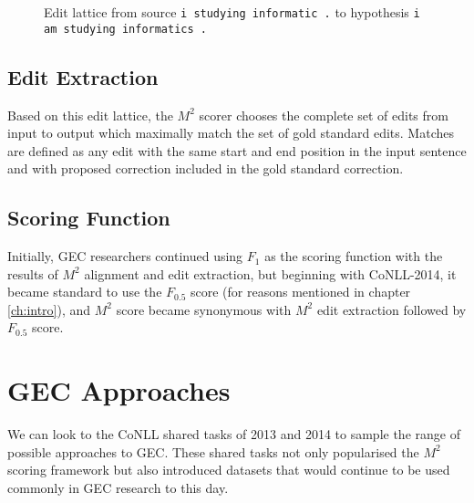 \begin{figure}[h]
\centering
\caption{Edit lattice from source \texttt{i studying informatic .} to hypothesis \texttt{i am studying informatics .}}
\label{fig:maxmatch-edit-lattice}
\end{figure}

\subsection{Edit Extraction}
Based on this edit lattice, the $M^2$ scorer chooses the complete set of edits from input to output which maximally match the set of gold standard edits. Matches are defined as any edit with the same start and end position in the input sentence and with proposed correction included in the gold standard correction.

\subsection{Scoring Function}
Initially, GEC researchers continued using $F_1$ as the scoring function with the results of $M^2$ alignment and edit extraction, but beginning with CoNLL-2014, it became standard to use the $F_{0.5}$ score (for reasons mentioned in chapter \ref{ch:intro}), and $M^2$ score became synonymous with $M^2$ edit extraction followed by $F_{0.5}$ score.

\section{GEC Approaches}
We can look to the CoNLL shared tasks of 2013 and 2014 to sample the range of possible approaches to GEC. These shared tasks not only popularised the $M^2$ scoring framework but also introduced datasets that would continue to be used commonly in GEC research to this day.

